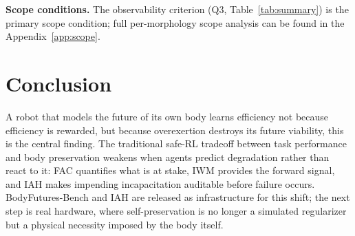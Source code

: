 \documentclass{article}
\begin{document}
{\textbf{Scope conditions.} The observability criterion (Q3, Table~\ref{tab:summary}) is the primary scope condition; full per-morphology scope analysis can be found in the Appendix~\ref{app:scope}.

\section{Conclusion}
\label{sec:conclusion}

A robot that models the future of its own body learns efficiency not because efficiency is rewarded, but because overexertion destroys its future viability, this is the central finding.
The traditional safe-RL tradeoff between task performance and body preservation weakens when agents predict degradation rather than react to it: FAC quantifies what is at stake, IWM provides the forward signal, and IAH makes impending incapacitation auditable before failure occurs.
BodyFutures-Bench and IAH are released as infrastructure for this shift; the next step is real hardware, where self-preservation is no longer a simulated regularizer but a physical necessity imposed by the body itself.



\newpage
\appendix

}
\end{document}
